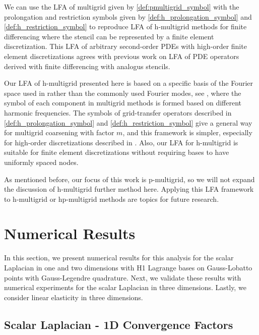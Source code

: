 \documentclass[review]{siamart190516}
\begin{document}
We can use the LFA of multigrid given by \cref{def:pmultigrid_symbol} with the prolongation and restriction symbols given by \cref{def:h_prolongation_symbol} and \cref{def:h_restriction_symbol} to reproduce LFA of h-multigrid methods for finite differencing where the stencil can be represented by a finite element discretization.
This LFA of arbitrary second-order PDEs with high-order finite element discretizations agrees with previous work on LFA of PDE operators derived with finite differencing with analogus stencils.

Our LFA of h-multigrid presented here is based on a specific basis of the Fourier space used in \cite{kumar2019local} rather than the commonly used Fourier modes, see \cite{MR1807961,wienands2004practical}, where the symbol of each component in multigrid methods is formed based on different harmonic frequencies.
The symbols of grid-transfer operators described in \cref{def:h_prolongation_symbol} and \cref{def:h_restriction_symbol} give a general way for multigrid coarsening with factor $m$, and this framework is simpler, especially for high-order discretizations described in \cite{he2020two}.
Also, our LFA for h-multigrid is suitable for finite element discretizations without requiring bases to have uniformly spaced nodes.

As mentioned before, our focus of this work is p-multigrid, so we will not expand the discussion of h-multigrid further method here.
Applying this LFA framework to h-multigrid or hp-multigrid methods are topics for future research.

\section{Numerical Results}\label{sec:results}

In this section, we present numerical results for this analysis for the scalar Laplacian in one and two dimensions with H1 Lagrange bases on Gauss-Lobatto points with Gauss-Legendre quadrature.
Next, we validate these results with numerical experiments for the scalar Laplacian in three dimensions.
Lastly, we consider linear elasticity in three dimensions.

\subsection{Scalar Laplacian - 1D Convergence Factors}\label{sec:1dresults}
\end{document}
